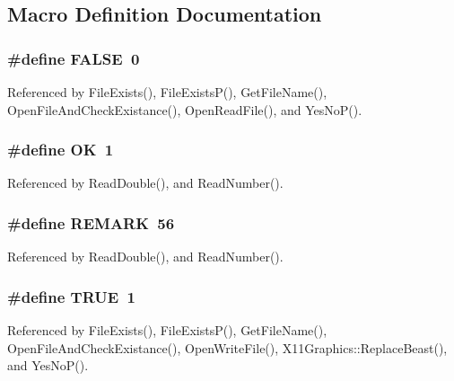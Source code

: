 \subsection{Macro Definition Documentation}
\subsubsection[{F\-A\-L\-S\-E}]{\setlength{\rightskip}{0pt plus 5cm}\#define F\-A\-L\-S\-E~0}\label{misc_8h_aa93f0eb578d23995850d61f7d61c55c1}


Referenced by File\-Exists(), File\-Exists\-P(), Get\-File\-Name(), Open\-File\-And\-Check\-Existance(), Open\-Read\-File(), and Yes\-No\-P().

\subsubsection[{O\-K}]{\setlength{\rightskip}{0pt plus 5cm}\#define O\-K~1}\label{misc_8h_aba51915c87d64af47fb1cc59348961c9}


Referenced by Read\-Double(), and Read\-Number().

\subsubsection[{R\-E\-M\-A\-R\-K}]{\setlength{\rightskip}{0pt plus 5cm}\#define R\-E\-M\-A\-R\-K~56}\label{misc_8h_ace9fba7267bf6a9a92654ce7f25c5516}


Referenced by Read\-Double(), and Read\-Number().

\subsubsection[{T\-R\-U\-E}]{\setlength{\rightskip}{0pt plus 5cm}\#define T\-R\-U\-E~1}\label{misc_8h_aa8cecfc5c5c054d2875c03e77b7be15d}


Referenced by File\-Exists(), File\-Exists\-P(), Get\-File\-Name(), Open\-File\-And\-Check\-Existance(), Open\-Write\-File(), X11\-Graphics\-::\-Replace\-Beast(), and Yes\-No\-P().



